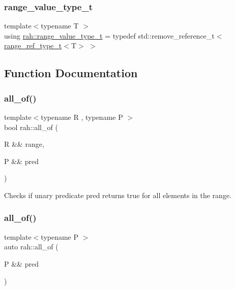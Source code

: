 \subsubsection{\texorpdfstring{range\_value\_type\_t}{range\_value\_type\_t}}
{\footnotesize\ttfamily template$<$typename T $>$ \\
using \mbox{\hyperlink{namespacerah_a4b32e39fb106af7036b20a39c4f024c1}{rah\+::range\+\_\+value\+\_\+type\+\_\+t}} = typedef std\+::remove\+\_\+reference\+\_\+t$<$\mbox{\hyperlink{namespacerah_a6622426bea22e9509614fe4c574ebeca}{range\+\_\+ref\+\_\+type\+\_\+t}}$<$T$>$ $>$}



\subsection{Function Documentation}
\mbox{\label{namespacerah_aaf7abb6066c8adfe6959691c3a3ea4e2}} 
\subsubsection{\texorpdfstring{all\_of()}{all\_of()}\hspace{0.1cm}{\footnotesize\ttfamily [1/2]}}
{\footnotesize\ttfamily template$<$typename R , typename P $>$ \\
bool rah\+::all\+\_\+of (\begin{DoxyParamCaption}\item[{R \&\&}]{range,  }\item[{P \&\&}]{pred }\end{DoxyParamCaption})}



Checks if unary predicate pred returns true for all elements in the range. 


\begin{DoxyCodeInclude}{0}
\DoxyCodeLine{    );}
\end{DoxyCodeInclude}
\mbox{\label{namespacerah_a4066165c960917a330beeed75a0f96e7}} 
\subsubsection{\texorpdfstring{all\_of()}{all\_of()}\hspace{0.1cm}{\footnotesize\ttfamily [2/2]}}
{\footnotesize\ttfamily template$<$typename P $>$ \\
auto rah\+::all\+\_\+of (\begin{DoxyParamCaption}\item[{P \&\&}]{pred }\end{DoxyParamCaption})}




